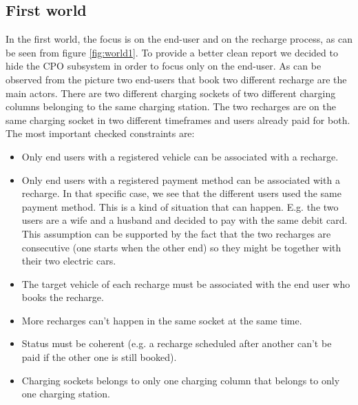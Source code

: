 \documentclass[a4paper]{report}
\begin{document}
\subsection{First world}
In the first world, the focus is on the end-user and on the recharge process, as can be seen from figure \ref{fig:world1}. To provide a better clean report we decided to hide the CPO subsystem in order to focus only on the end-user. As can be observed from the picture two end-users that book two different recharge are the main actors. There are two different charging sockets of two different charging columns belonging to the same charging station. The two recharges are on the same charging socket in two different timeframes and users already paid for both. The most important checked constraints are:
\begin{itemize}
    \item Only end users with a registered vehicle can be associated with a recharge.
    \item Only end users with a registered payment method can be associated with a recharge. In that specific case, we see that the different users used the same payment method. This is a kind of situation that can happen. E.g. the two users are a wife and a husband and decided to pay with the same debit card. This assumption can be supported by the fact that the two recharges are consecutive (one starts when the other end) so they might be together with their two electric cars.
    \item The target vehicle of each recharge must be associated with the end user who books the recharge.
    \item More recharges can't happen in the same socket at the same time.
    \item Status must be coherent (e.g. a recharge scheduled after another can't be paid if the other one is still booked).
    \item Charging sockets belongs to only one charging column that belongs to only one charging station.
\end{itemize}
\end{document}
